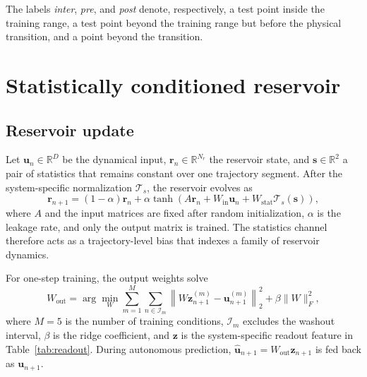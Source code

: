 \documentclass[10pt,a4paper]{article}
\begin{document}
The labels \emph{inter}, \emph{pre}, and \emph{post} denote, respectively, a
test point inside the training range, a test point beyond the training range but
before the physical transition, and a point beyond the transition.

\section{Statistically conditioned reservoir}

\subsection{Reservoir update}

Let $\bm{u}_n\in\mathbb{R}^{D}$ be the dynamical input, $\bm{r}_n\in
\mathbb{R}^{N_r}$ the reservoir state, and $\bm{s}\in\mathbb{R}^{2}$ a pair of
statistics that remains constant over one trajectory segment. After the
system-specific normalization $\mathcal{T}_s$, the reservoir evolves as
\begin{equation}
  \bm{r}_{n+1}
  = (1-\alpha)\bm{r}_{n}
  + \alpha\tanh\!\left(
      A\bm{r}_{n}+W_{\mathrm{in}}\bm{u}_{n}
      +W_{\mathrm{stat}}\mathcal{T}_s(\bm{s})
    \right),
  \label{eq:scdt-update}
\end{equation}
where $A$ and the input matrices are fixed after random initialization,
$\alpha$ is the leakage rate, and only the output matrix is trained. The
statistics channel therefore acts as a trajectory-level bias that indexes a
family of reservoir dynamics.

For one-step training, the output weights solve
\begin{equation}
  W_{\mathrm{out}}
  = \arg\min_W
  \sum_{m=1}^{M}\sum_{n\in\mathcal{I}_m}
  \left\|W\bm{z}^{(m)}_{n+1}-\bm{u}^{(m)}_{n+1}\right\|_2^2
  +\beta\|W\|_F^2,
  \label{eq:ridge}
\end{equation}
where $M=5$ is the number of training conditions, $\mathcal{I}_m$ excludes the
washout interval, $\beta$ is the ridge coefficient, and $\bm{z}$ is the
system-specific readout feature in Table~\ref{tab:readout}. During autonomous
prediction, $\widehat{\bm{u}}_{n+1}=W_{\mathrm{out}}\bm{z}_{n+1}$ is fed back
as $\bm{u}_{n+1}$.
\end{document}
